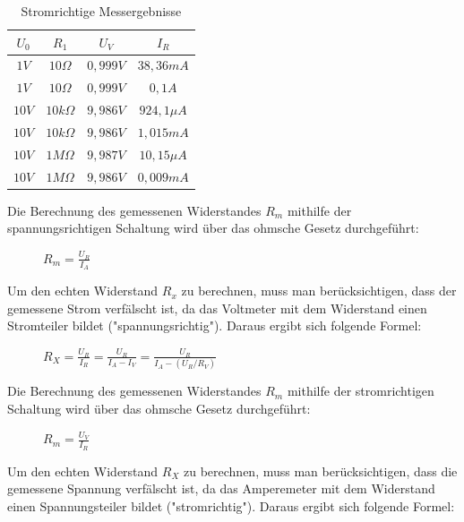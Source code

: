 \documentclass[12pt,a4paper,titlepage]{article}
\begin{document}
\begin{table}[H]
  \centering
  \label{Figure2.5.2}
  \begin{tabular}{c|c|c|c}
    $U_0$ & $R_1$ & $U_V$ & $I_R$ \\
    \hline
    $1V$ & $10\Omega$ & $0,999V$ & $38,36mA$ \\
    \hline
    $1V$ & $10\Omega$ & $0,999V$ & $0,1A$ \\
    \hline
    $10V$ & $10k\Omega$ & $9,986V$ & $924,1\mu A$ \\
    \hline
    $10V$ & $10k\Omega$ & $9,986V$ & $1,015mA$ \\
    \hline
    $10V$ & $1M\Omega$ & $9,987V$ & $10,15\mu A$ \\
    \hline
    $10V$ & $1M\Omega$ & $9,986V$ & $0,009mA$
  \end{tabular}
  \caption{Stromrichtige Messergebnisse}
\end{table}

\noindent Die Berechnung des gemessenen Widerstandes $R_m$ mithilfe der spannungsrichtigen Schaltung wird über das ohmsche Gesetz durchgeführt:

\begin{figure}[H]
  \centering
  \label{Figure2.5.3}
  $R_m = \frac{U_R}{I_A}$
\end{figure}

\noindent Um den echten Widerstand $R_x$ zu berechnen, muss man berücksichtigen, dass der gemessene Strom verfälscht ist, da das Voltmeter mit dem Widerstand einen Stromteiler bildet ("spannungsrichtig"). Daraus ergibt sich folgende Formel:

\begin{figure}[H]
  \centering
  \label{Figure2.5.4}
  $R_X = \frac{U_R}{I_R} = \frac{U_R}{I_A-I_V} = \frac{U_R}{I_A-(U_R/R_V)}$
\end{figure}

\noindent Die Berechnung des gemessenen Widerstandes $R_m$ mithilfe der stromrichtigen Schaltung wird über das ohmsche Gesetz durchgeführt:

\begin{figure}[H]
  \centering
  \label{Figure2.5.5}
  $R_m = \frac{U_V}{I_R}$
\end{figure}

\noindent Um den echten Widerstand $R_X$ zu berechnen, muss man berücksichtigen, dass die gemessene Spannung verfälscht ist, da das Amperemeter mit dem Widerstand einen Spannungsteiler bildet ("stromrichtig"). Daraus ergibt sich folgende Formel:
\end{document}
